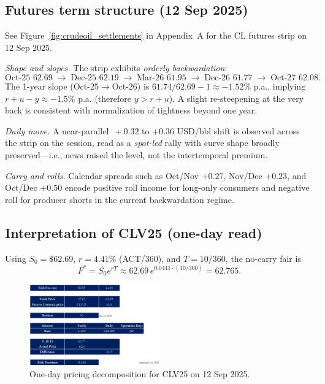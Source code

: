 \documentclass[11pt,a4paper]{article} %
\begin{document}
\subsection{Futures term structure (12 Sep 2025)}

See Figure~\ref{fig:crudeoil_settlements} in Appendix~A for the CL futures strip on 12 Sep 2025.

\textit{Shape and slopes.} The strip exhibits \emph{orderly backwardation}:
\[
\text{Oct-25 } {62.69} \;\rightarrow\; \text{Dec-25 } {62.19}
\;\rightarrow\; \text{Mar-26 } {61.95}
\;\rightarrow\; \text{Dec-26 } {61.77}
\;\rightarrow\; \text{Oct-27 } {62.08}.
\]
The 1-year slope (Oct-25\(\to\)Oct-26) is \(61.74/62.69-1\approx {-1.52\%}\) p.a., implying \(r+u-y\approx -1.5\%\) p.a. (therefore \(y>r+u\)). A slight re-steepening at the very back is consistent with normalization of tightness beyond one year.

\textit{Daily move.} A near-parallel \(\,+0.32\) to \(+0.36\) USD/bbl shift is observed across the strip on the session, read as a \emph{spot-led} rally with curve shape broadly preserved—i.e., news raised the level, not the intertemporal premium.

\textit{Carry and rolls.} Calendar spreads such as Oct/Nov \(+0.27\), Nov/Dec \(+0.23\), and Oct/Dec \(+0.50\) encode positive roll income for long-only consumers and negative roll for producer shorts in the current backwardation regime.

\subsection{Interpretation of \texorpdfstring{CLV25}{CLV25} (one-day read)}

Using \(S_0=\$62.69\), \(r=4.41\%\) (ACT/360), and \(T=10/360\), the no-carry fair is
\[
F^{*}=S_0 e^{rT} \approx 62.69\,e^{0.0441\cdot(10/360)}={62.765}.
\]

\begin{figure}[h]
  \centering
  \includegraphics[width=0.5\textwidth]{figures/wti.png}
  \caption{One-day pricing decomposition for CLV25 on 12 Sep 2025.}
\end{figure}
\end{document}
